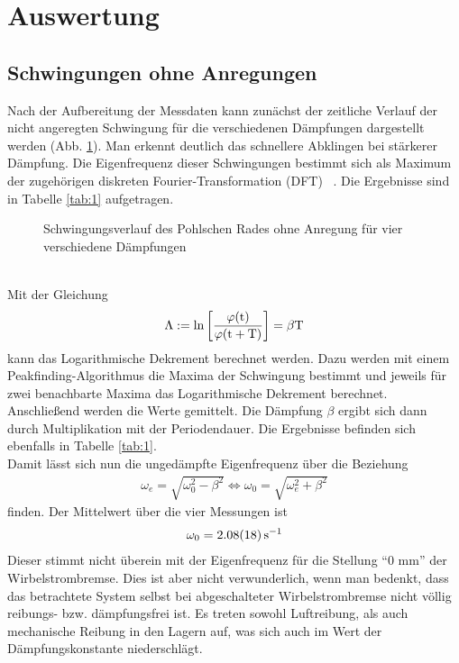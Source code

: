\section{Auswertung}
\subsection{Schwingungen ohne Anregungen}
Nach der Aufbereitung der Messdaten kann zunächst der zeitliche Verlauf der nicht angeregten Schwingung für die verschiedenen Dämpfungen dargestellt werden (Abb. \ref{img:1}). Man erkennt deutlich das schnellere Abklingen bei stärkerer Dämpfung. 
Die Eigenfrequenz dieser Schwingungen bestimmt sich als Maximum der zugehörigen diskreten Fourier-Transformation (DFT) ~\cite[Rao, 2010]{FFT}. Die Ergebnisse sind in Tabelle \ref{tab:1} aufgetragen.
\begin{figure}[!htbp]
\centering
   
   \caption{\small{Schwingungsverlauf des Pohlschen Rades ohne Anregung für vier verschiedene Dämpfungen}}
   \label{img:1}
\end{figure}
\ \\
Mit der Gleichung
\begin{align}
\Lambda := \rm {ln}\left[{\frac{\varphi(t)}{\varphi(t+T)}}\right]=\beta T \nonumber
\end{align}
kann das Logarithmische Dekrement berechnet werden. Dazu werden mit einem Peakfinding-Algorithmus die Maxima der Schwingung bestimmt und jeweils für zwei benachbarte Maxima das Logarithmische Dekrement berechnet. Anschließend werden die Werte gemittelt. Die Dämpfung $\beta$ ergibt sich dann durch Multiplikation mit der Periodendauer. Die Ergebnisse befinden sich ebenfalls in Tabelle \ref{tab:1}.\\
Damit lässt sich nun die ungedämpfte Eigenfrequenz über die Beziehung
\begin{align}
\omega_e = \sqrt{\omega_0^{2}-\beta^{2}}  \Leftrightarrow \omega_0 = \sqrt{\omega_e^{2}+\beta^{2}}
\end{align}
finden. Der Mittelwert über die vier Messungen ist
\begin{align}
\omega_0 = \SI{2,08\pm0,18}{\per\second} \nonumber
\end{align}
Dieser stimmt nicht überein mit der Eigenfrequenz für die Stellung "`0 mm"' der Wirbelstrombremse. Dies ist aber nicht verwunderlich, wenn man bedenkt, dass das betrachtete System selbst bei abgeschalteter Wirbelstrombremse nicht völlig reibungs- bzw. dämpfungsfrei ist. Es treten sowohl Luftreibung, als auch mechanische Reibung in den Lagern auf, was sich auch im Wert der Dämpfungskonstante niederschlägt.
